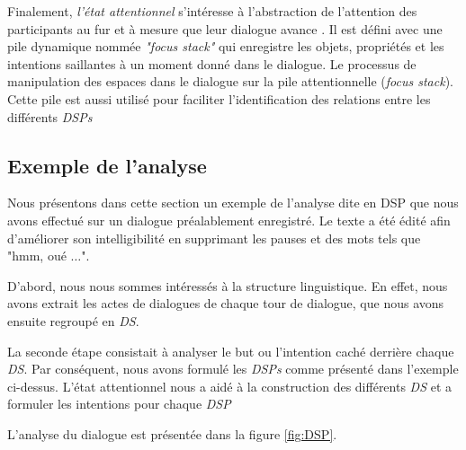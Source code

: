 			
			Finalement, \emph{l'état attentionnel} s'intéresse à l'abstraction de l'attention des participants au fur et à mesure que leur dialogue avance \cite{sidner1994artificial}. Il est défini avec une pile dynamique nommée \emph{"focus stack"} qui enregistre les objets, propriétés et les intentions saillantes  à un moment donné dans le dialogue. Le processus de manipulation des espaces dans le dialogue sur la pile attentionnelle (\emph{focus stack}). Cette pile est aussi utilisé pour faciliter l'identification des relations entre les différents \emph{DSPs}
			

		 \subsection{Exemple de l'analyse}
			 Nous présentons dans cette section un exemple de l'analyse dite en DSP que nous avons effectué sur un dialogue préalablement enregistré. Le texte a été édité afin d'améliorer son intelligibilité en supprimant les pauses et des mots tels que "hmm, oué $\ldots$".
			 
			 D'abord, nous nous sommes intéressés à la structure linguistique. En effet, nous avons extrait les actes de dialogues de chaque tour de dialogue, que nous avons ensuite regroupé en \emph{DS}. 
			 
			 La seconde étape consistait à analyser le but ou l'intention caché derrière chaque \emph{DS}. Par conséquent, nous avons formulé les \emph{DSPs} comme présenté dans l'exemple ci-dessus. L'état attentionnel nous a aidé à la construction des différents \emph{DS} et a formuler les intentions pour chaque \emph{DSP}	
			
			L'analyse du dialogue est présentée dans la figure \ref{fig:DSP}.
			
